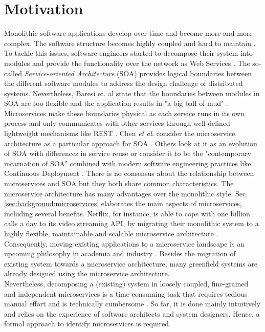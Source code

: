 \section{Motivation}
\label{sec:Introduction:Motivation}
Monolithic software applications develop over time and become more and more complex. The software structure becomes highly coupled and hard to maintain \cite{MigratingTowardsSurvey}. To tackle this issues, software engineers started to decompose their system into modules and provide the functionality over the network as Web Services \cite{ServiceCutter}. The so-called \textit{Service-oriented Architecture} (SOA) provides logical boundaries between the different software modules to address the design challenge of distributed systems. Nevertheless, Baresi et. al state that the boundaries between modules in SOA are too flexible and the application results in "a big ball of mud" \cite{interfaceAnalysisBaresi}. Microservices make these boundaries physical as each service runs in its own process and only communicates with other services through well-defined lightweight mechanisms like REST \cite{FunctionalDecompositionHeinrich}. Chen \textit{et al}. consider the microservice architecture as a particular approach for SOA \cite{DataflowDrivenChen}. Others look at it as an evolution of SOA with differences in service reuse \cite{interfaceAnalysisBaresi} or consider it to be the "contemporary incarnation of SOA" combined with modern software engineering practices like Continuous Deployment \cite{ServiceCutter}. There is no consensus about the relationship between microservices and SOA but they both share common characteristics.
The microservice architecture has many advantages over the monolithic style. Sec.\ref{sec:background:microservices} elaborates the main aspects of microservices, including several benefits. Netflix, for instance, is able to cope with one billion calls a day to its video streaming API, by migrating their monolithic system to a highly flexible, maintainable and scalable microservice architecture \cite{DataflowDrivenChen}. Consequently, moving existing applications to a microservice landscape is an upcoming philosophy in academia and industry \cite{ObjectAwareAmiri}. Besides the migration of existing system towards a microservice architecture, many greenfield systems are already designed using the microservice architecture.\\
Nevertheless, decomposing a (existing) system in loosely coupled, fine-grained and independent microservices is a time consuming task that requires tedious manual effort \cite{ServiceCutter} and is technically cumbersome \cite{HeuristicsAlwis}. So far, it is done mainly intuitively and relies on the experience of software architects and system designers. Hence, a formal approach to identify microservices is required. 


